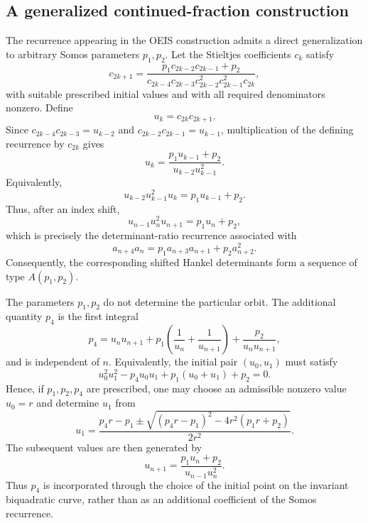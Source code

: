 \documentclass[11pt]{article}
\theoremstyle{remark}
\begin{document}
\subsection{A generalized continued-fraction construction}
The recurrence appearing in the OEIS construction admits a direct generalization to arbitrary Somos parameters $p_1,p_2$. Let the Stieltjes coefficients $c_k$ satisfy
\begin{equation}
c_{2k+1}=\frac{p_1c_{2k-2}c_{2k-1}+p_2}{c_{2k-4}c_{2k-3}c_{2k-2}^{2}c_{2k-1}^{2}c_{2k}},
\end{equation}
with suitable prescribed initial values and with all required denominators nonzero. Define
\begin{equation}
u_k=c_{2k}c_{2k+1}.
\end{equation}
Since $c_{2k-4}c_{2k-3}=u_{k-2}$ and $c_{2k-2}c_{2k-1}=u_{k-1}$, multiplication of the defining recurrence by $c_{2k}$ gives
\begin{equation}
u_k=\frac{p_1u_{k-1}+p_2}{u_{k-2}u_{k-1}^{2}}.
\end{equation}
Equivalently,
\begin{equation}
u_{k-2}u_{k-1}^{2}u_k=p_1u_{k-1}+p_2.
\end{equation}
Thus, after an index shift,
\begin{equation}
u_{n-1}u_n^{2}u_{n+1}=p_1u_n+p_2,
\end{equation}
which is precisely the determinant-ratio recurrence associated with
\begin{equation}
a_{n+4}a_n=p_1a_{n+3}a_{n+1}+p_2a_{n+2}^{2}.
\end{equation}
Consequently, the corresponding shifted Hankel determinants form a sequence of type $A(p_1,p_2)$.

The parameters $p_1,p_2$ do not determine the particular orbit. The additional quantity $p_4$ is the first integral
\begin{equation}
p_4=u_nu_{n+1}+p_1\left(\frac{1}{u_n}+\frac{1}{u_{n+1}}\right)+\frac{p_2}{u_nu_{n+1}},
\end{equation}
and is independent of $n$. Equivalently, the initial pair $(u_0,u_1)$ must satisfy
\begin{equation}
u_0^{2}u_1^{2}-p_4u_0u_1+p_1(u_0+u_1)+p_2=0.
\end{equation}
Hence, if $p_1,p_2,p_4$ are prescribed, one may choose an admissible nonzero value $u_0=r$ and determine $u_1$ from
\begin{equation}
u_1=\frac{p_4r-p_1\mathbin{\pm}\sqrt{(p_4r-p_1)^2-4r^2(p_1r+p_2)}}{2r^2}.
\end{equation}
The subsequent values are then generated by
\begin{equation}
u_{n+1}=\frac{p_1u_n+p_2}{u_{n-1}u_n^{2}}.
\end{equation}
Thus $p_4$ is incorporated through the choice of the initial point on the invariant biquadratic curve, rather than as an additional coefficient of the Somos recurrence.
\end{document}
